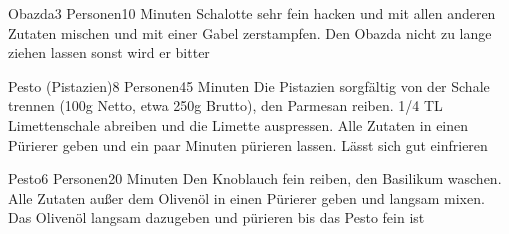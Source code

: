 
\begin{recipe}{Obazda}{3 Personen}{10 Minuten}
Schalotte sehr fein hacken und mit allen anderen Zutaten mischen und mit einer Gabel zerstampfen. Den Obazda nicht zu lange ziehen lassen sonst wird er bitter
\end{recipe}


\begin{recipe}{Pesto (Pistazien)}{8 Personen}{45 Minuten}
Die Pistazien sorgfältig von der Schale trennen (100g Netto, etwa 250g Brutto), den Parmesan reiben. 1/4 TL Limettenschale abreiben und die Limette auspressen. Alle Zutaten in einen Pürierer geben und ein paar Minuten pürieren lassen. Lässt sich gut einfrieren
\end{recipe} 


\begin{recipe}{Pesto}{6 Personen}{20 Minuten}
Den Knoblauch fein reiben, den Basilikum waschen. Alle Zutaten außer dem Olivenöl in einen Pürierer geben und langsam mixen. Das Olivenöl langsam dazugeben und pürieren bis das Pesto fein ist
\end{recipe} 


